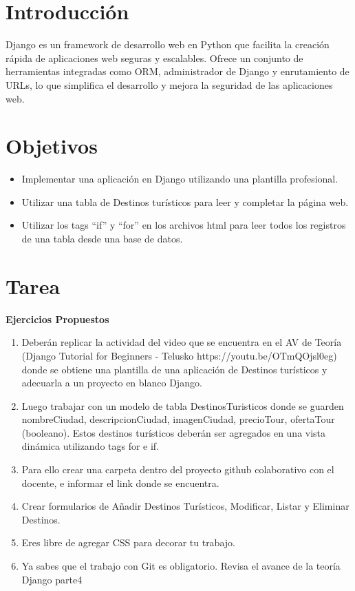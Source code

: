 \documentclass{article}
\begin{document}
  \section{Introducción}
  Django es un framework de desarrollo web en Python que facilita la creación rápida de aplicaciones web seguras y escalables.
  Ofrece un conjunto de herramientas integradas como ORM, administrador de Django y enrutamiento de URLs, lo que simplifica el 
  desarrollo y mejora la seguridad de las aplicaciones web.


  \section{Objetivos}
  \begin{itemize}
    \item Implementar una aplicación en Django utilizando una plantilla profesional.
    \item Utilizar una tabla de Destinos turísticos para leer y completar la página web.
    \item Utilizar los tags “if” y “for” en los archivos html para leer todos los registros de una tabla desde una base de datos.
  \end{itemize}

 
	\section{Tarea}
  \textbf{Ejercicios Propuestos}
  \begin{enumerate}
  \item Deberán replicar la actividad del video que se encuentra en el AV de Teoría (Django Tutorial for Beginners - Telusko https://youtu.be/OTmQOjsl0eg) donde se obtiene una plantilla de una aplicación de Destinos turísticos y adecuarla a un proyecto en blanco Django.
  \item Luego trabajar con un modelo de tabla DestinosTuristicos donde se guarden nombreCiudad,  descripcionCiudad, imagenCiudad, precioTour, ofertaTour (booleano).  Estos destinos turísticos deberán ser agregados en una vista dinámica utilizando tags for e if.
  \item Para ello crear una carpeta dentro del proyecto github colaborativo con el docente, e informar el link donde se encuentra.
  \item Crear formularios de Añadir Destinos Turísticos, Modificar, Listar y Eliminar Destinos.  
  \item Eres libre de agregar CSS para decorar tu trabajo.
  \item Ya sabes que el trabajo con Git es obligatorio.  Revisa el avance de la teoría Django parte4
  \end{enumerate}
\end{document}
